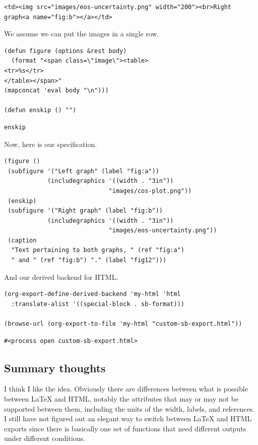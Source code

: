 \documentclass[11pt]{article}
\begin{document}
\begin{verbatim}
<td><img src="images/eos-uncertainty.png" width="200"><br>Right graph<a name="fig:b"></a></td>
\end{verbatim}

We assume we can put the images in a single row.

\begin{verbatim}
(defun figure (options &rest body)
  (format "<span class=\"image\"><table>
<tr>%s</tr>
</table></span>"
(mapconcat 'eval body "\n")))

(defun enskip () "")
\end{verbatim}

\begin{verbatim}
enskip
\end{verbatim}

Now, here is our specification.
\begin{verbatim}
(figure ()
 (subfigure '("Left graph" (label "fig:a"))
            (includegraphics '((width . "3in"))
                             "images/cos-plot.png"))
 (enskip)
 (subfigure '("Right graph" (label "fig:b"))
            (includegraphics '((width . "3in"))
                             "images/eos-uncertainty.png"))
 (caption
  "Text pertaining to both graphs, " (ref "fig:a")
  " and " (ref "fig:b") "." (label "fig12")))
\end{verbatim}

And our derived backend for HTML.
\begin{verbatim}
(org-export-define-derived-backend 'my-html 'html
  :translate-alist '((special-block . sb-format)))

(browse-url (org-export-to-file 'my-html "custom-sb-export.html"))
\end{verbatim}

\begin{verbatim}
#<process open custom-sb-export.html>
\end{verbatim}

\subsection{Summary thoughts}
\label{sec-1-3}
I think I like the idea. Obviously there are differences between what is possible between \LaTeX{} and HTML, notably the attributes that may or may not be supported between them, including the units of the width, labels, and references. I still have not figured out an elegant way to switch between \LaTeX{} and HTML exports since there is basically one set of functions that need different outputs under different conditions.
\end{document}
